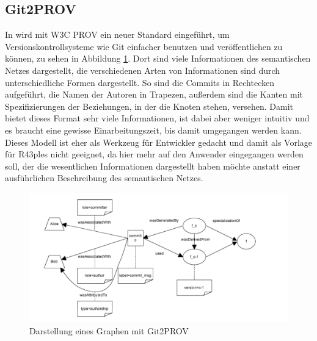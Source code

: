 \documentclass[nocolor]{tudbook}
\begin{document}
\subsection{Git2PROV}
\label{sec:Git2PROV}
In \cite{Git2PROV} wird mit W3C PROV ein neuer Standard eingeführt, um Versionskontrollsysteme wie Git einfacher benutzen und veröffentlichen zu können, zu sehen in Abbildung \ref{fig:Git2PROV}. Dort sind viele Informationen des semantischen Netzes dargestellt, die verschiedenen Arten von Informationen sind durch unterschiedliche Formen dargestellt. So sind die Commits in Rechtecken aufgeführt, die Namen der Autoren in Trapezen, außerdem sind die Kanten mit Spezifizierungen der Beziehungen, in der die Knoten stehen, versehen. Damit bietet dieses Format sehr viele Informationen, ist dabei aber weniger intuitiv und es braucht eine gewisse Einarbeitungszeit, bis damit umgegangen werden kann. Dieses Modell ist eher als Werkzeug für Entwickler gedacht und damit als Vorlage für R43ples nicht geeignet, da hier mehr auf den Anwender eingegangen werden soll, der die wesentlichen Informationen dargestellt haben möchte anstatt einer ausführlichen Beschreibung des semantischen Netzes.

\begin{figure}[htbp] 
  \centering
     \includegraphics[width=\textwidth]{Git2PROV.png}
  \caption[Darstellung eines Graphen mit Git2PROV, entnommen aus \cite{Git2PROV}]{Darstellung eines Graphen mit Git2PROV}
  \label{fig:Git2PROV}
\end{figure}
\end{document}
